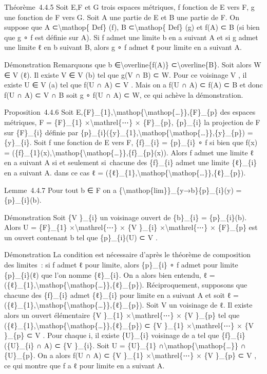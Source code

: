\documentclass[]{article}
\begin{document}
Théorème~4.4.5 Soit E,F et G trois espaces métriques, f fonction de E
vers F, g une fonction de F vers G. Soit A une partie de E et B une
partie de F. On suppose que A ⊂\textbackslash{}mathop\{ Def\} (f), B
⊂\textbackslash{}mathop\{ Def\} (g) et f(A) ⊂ B (si bien que g ∘ f est
définie sur A). Si f admet une limite b en a suivant A et si g admet une
limite ℓ en b suivant B, alors g ∘ f admet ℓ pour limite en a suivant A.

Démonstration Remarquons que b ∈\textbackslash{}overline\{f(A)\}
⊂\textbackslash{}overline\{B\}. Soit alors W ∈ V (ℓ). Il existe V ∈ V
(b) tel que g(V ∩ B) ⊂ W. Pour ce voisinage V , il existe U ∈ V (a) tel
que f(U ∩ A) ⊂ V . Mais on a f(U ∩ A) ⊂ f(A) ⊂ B et donc f(U ∩ A) ⊂ V ∩
B soit g ∘ f(U ∩ A) ⊂ W, ce qui achève la démonstration.

Proposition~4.4.6 Soit
E,\{F\}\_\{1\},\textbackslash{}mathop\{\textbackslash{}mathop\{\ldots{}\}\},\{F\}\_\{p\}
des espaces métriques, F = \{F\}\_\{1\} ×\textbackslash{}mathrel\{⋯\} ×
\{F\}\_\{p\}, \{p\}\_\{i\} la projection de F sur \{F\}\_\{i\} définie
par
\{p\}\_\{i\}(\{y\}\_\{1\},\textbackslash{}mathop\{\textbackslash{}mathop\{\ldots{}\}\},\{y\}\_\{p\})
= \{y\}\_\{i\}. Soit f une fonction de E vers F, \{f\}\_\{i\} =
\{p\}\_\{i\} ∘ f si bien que f(x) =
(\{f\}\_\{1\}(x),\textbackslash{}mathop\{\textbackslash{}mathop\{\ldots{}\}\},\{f\}\_\{p\}(x)).
Alors f admet une limite ℓ en a suivant A si et seulement si~chacune des
\{f\}\_\{i\} admet une limite \{ℓ\}\_\{i\} en a suivant A. dans ce cas ℓ
=
(\{ℓ\}\_\{1\},\textbackslash{}mathop\{\textbackslash{}mathop\{\ldots{}\}\},\{ℓ\}\_\{p\}).

Lemme~4.4.7 Pour tout b ∈ F on a
\{\textbackslash{}mathop\{lim\}\}\_\{y→b\}\{p\}\_\{i\}(y) =
\{p\}\_\{i\}(b).

Démonstration Soit \{V \}\_\{i\} un voisinage ouvert de \{b\}\_\{i\} =
\{p\}\_\{i\}(b). Alors U = \{F\}\_\{1\} ×\textbackslash{}mathrel\{⋯\} ×
\{V \}\_\{i\} ×\textbackslash{}mathrel\{⋯\} × \{F\}\_\{p\} est un ouvert
contenant b tel que \{p\}\_\{i\}(U) ⊂ V .

Démonstration La condition est nécessaire d'après le théorème de
composition des limites~: si f admet ℓ pour limite, alors \{p\}\_\{i\} ∘
f admet pour limite \{p\}\_\{i\}(ℓ) que l'on nomme \{ℓ\}\_\{i\}. On a
alors bien entendu, ℓ =
(\{ℓ\}\_\{1\},\textbackslash{}mathop\{\textbackslash{}mathop\{\ldots{}\}\},\{ℓ\}\_\{p\}).
Réciproquement, supposons que chacune des \{f\}\_\{i\} admet
\{ℓ\}\_\{i\} pour limite en a suivant A et soit ℓ =
(\{ℓ\}\_\{1\},\textbackslash{}mathop\{\textbackslash{}mathop\{\ldots{}\}\},\{ℓ\}\_\{p\}).
Soit V un voisinage de ℓ. Il existe alors un ouvert élémentaire \{V
\}\_\{1\} ×\textbackslash{}mathrel\{⋯\} × \{V \}\_\{p\} tel que
(\{ℓ\}\_\{1\},\textbackslash{}mathop\{\textbackslash{}mathop\{\ldots{}\}\},\{ℓ\}\_\{p\})
⊂ \{V \}\_\{1\} ×\textbackslash{}mathrel\{⋯\} × \{V \}\_\{p\} ⊂ V . Pour
chaque i, il existe \{U\}\_\{i\} voisinage de a tel que
\{f\}\_\{i\}(\{U\}\_\{i\} ∩ A) ⊂ \{V \}\_\{i\}. Soit U = \{U\}\_\{1\}
∩\textbackslash{}mathop\{\textbackslash{}mathop\{\ldots{}\}\} ∩
\{U\}\_\{p\}. On a alors f(U ∩ A) ⊂ \{V \}\_\{1\}
×\textbackslash{}mathrel\{⋯\} × \{V \}\_\{p\} ⊂ V , ce qui montre que f
a ℓ pour limite en a suivant A.
\end{document}
